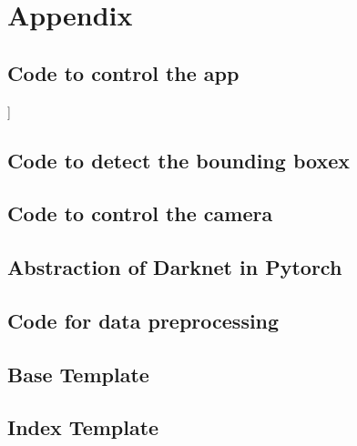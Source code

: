 \chapter{Appendix}

\section{Code to control the app}]\label{ap:app}


\section{Code to detect the bounding boxex}\label{ap:bbox}


\section{Code to control the camera}\label{ap:camera}


\section{Abstraction of Darknet in Pytorch}\label{ap:darknet}


\section{Code for data preprocessing}\label{ap:preprocess}


\section{Base Template}\label{ap:template1}


\section{Index Template}\label{ap:template2}







